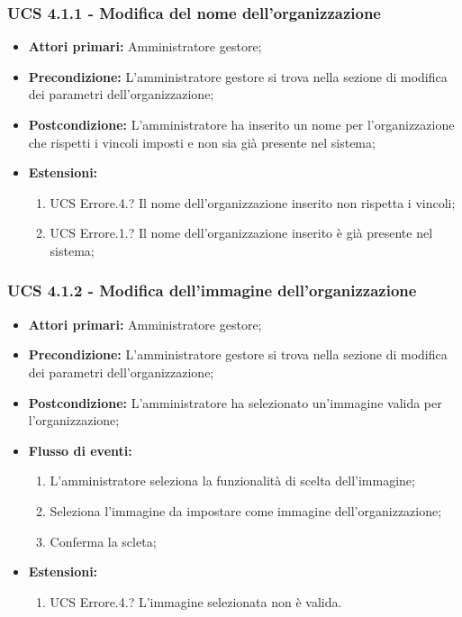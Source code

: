 \subsubsection{UCS 4.1.1 - Modifica del nome dell'organizzazione}%
\begin{itemize}
\item \textbf{Attori primari:} Amministratore gestore;
\item \textbf{Precondizione:} L'amministratore gestore si trova nella sezione di modifica dei parametri dell'organizzazione;
\item \textbf{Postcondizione:} L'amministratore ha inserito un nome per l'organizzazione che rispetti i vincoli imposti e non sia già presente nel sistema;
\item \textbf{Estensioni:}
\begin{enumerate}
    \item UCS Errore.4.? Il nome dell'organizzazione inserito non rispetta i vincoli;
    \item UCS Errore.1.? Il nome dell'organizzazione inserito è già presente nel sistema;
\end{enumerate}
\end{itemize}

\subsubsection{UCS 4.1.2 - Modifica dell'immagine dell'organizzazione}%
\begin{itemize}
\item \textbf{Attori primari:} Amministratore gestore;
\item \textbf{Precondizione:} L'amministratore gestore si trova nella sezione di modifica dei parametri dell'organizzazione;
\item \textbf{Postcondizione:} L'amministratore ha selezionato un'immagine valida per l'organizzazione;
\item \textbf{Flusso di eventi:}
\begin{enumerate}
    \item L'amministratore seleziona la funzionalità di scelta dell'immagine;
    \item Seleziona l'immagine da impostare come immagine dell'organizzazione;
    \item Conferma la scleta;
\end{enumerate}
\item \textbf{Estensioni:}
\begin{enumerate}
    \item UCS Errore.4.? L'immagine selezionata non è valida.
\end{enumerate}
\end{itemize}

